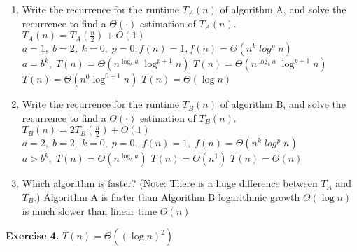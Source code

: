 \documentclass[12pt,letterpaper,final]{report}
\begin{document}
\begin{enumerate}
\item Write the recurrence for the runtime $T_A(n)$ of algorithm A, and solve the recurrence to find a $\Theta( \cdot)$ estimation of $T_A(n)$.
\newline
\newline $T_A(n)= T_A (\frac{n}{2}) + O(1)$  
\newline $ a = 1, \; b = 2, \; k = 0, \; p = 0; f(n) = 1, f(n) = \Theta (n^{k} \; log^p \; n)$
\newline $a = b^k, \; T(n) = \Theta (n^{\log_b a} \; \log^{p + 1} n)$ 
\newline $T(n) = \Theta (n^{\log_b a} \; \log^{p + 1} n)$
\newline $T(n) = \Theta (n^{0} \log^{0+1} n)$
\newline $T(n) = \Theta (\log n)$


\item Write the recurrence for the runtime $T_B(n)$ of algorithm B, and solve the recurrence to find a $\Theta( \cdot)$ estimation of $T_B(n)$.
\newline 
\newline$T_B(n)= 2 T_B (\frac{n}{2}) + O(1)$  
\newline $ a = 2, \; b = 2, \; k = 0, \; p = 0, \; f(n) = 1, \; f(n) = \Theta (n^{k} \; log^p \; n)$ 
\newline $ a > b^k, \; T(n) = \Theta (n^{\log_b a} )$
\newline $ T(n) = \Theta (n^1)$
\newline $ T(n) = \Theta (n)$

\item Which algorithm is faster? (Note: There is a huge difference between $T_A$ and $T_B$.)
\newline
Algorithm A is faster than Algorithm B logarithmic growth $\Theta (\log n)$ is much slower than linear time $\Theta(n)$


\end{enumerate}
\bigskip

\textbf{Exercise 4.}
\newline
\newline $ T(n) = \Theta ((\log n)^2)$
\end{document}

